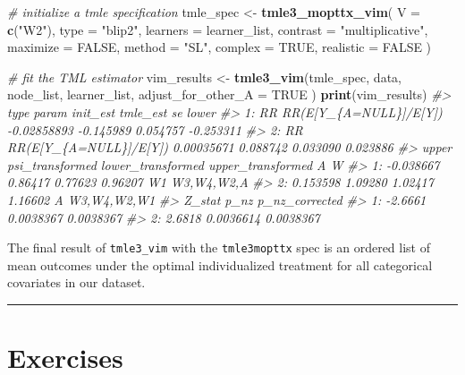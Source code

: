 \documentclass[12pt, krantz2,]{book}
\newenvironment{Shaded}{\begin{snugshade}}{\end{snugshade}}
\newcommand{\CommentTok}[1]{\textcolor[rgb]{0.56,0.35,0.01}{\textit{#1}}}
\newcommand{\DataTypeTok}[1]{\textcolor[rgb]{0.13,0.29,0.53}{#1}}
\newcommand{\KeywordTok}[1]{\textcolor[rgb]{0.13,0.29,0.53}{\textbf{#1}}}
\newcommand{\NormalTok}[1]{#1}
\newcommand{\OtherTok}[1]{\textcolor[rgb]{0.56,0.35,0.01}{#1}}
\newcommand{\StringTok}[1]{\textcolor[rgb]{0.31,0.60,0.02}{#1}}
\theoremstyle{definition}
\theoremstyle{definition}
\theoremstyle{definition}
\newcommand{\1}{\mathbbm{1}}
\begin{document}
\begin{Shaded}
\begin{Highlighting}[]
\CommentTok{# initialize a tmle specification}
\NormalTok{tmle_spec <-}\StringTok{ }\KeywordTok{tmle3_mopttx_vim}\NormalTok{(}
  \DataTypeTok{V =} \KeywordTok{c}\NormalTok{(}\StringTok{"W2"}\NormalTok{),}
  \DataTypeTok{type =} \StringTok{"blip2"}\NormalTok{,}
  \DataTypeTok{learners =}\NormalTok{ learner_list,}
  \DataTypeTok{contrast =} \StringTok{"multiplicative"}\NormalTok{,}
  \DataTypeTok{maximize =} \OtherTok{FALSE}\NormalTok{,}
  \DataTypeTok{method =} \StringTok{"SL"}\NormalTok{,}
  \DataTypeTok{complex =} \OtherTok{TRUE}\NormalTok{,}
  \DataTypeTok{realistic =} \OtherTok{FALSE}
\NormalTok{)}
\end{Highlighting}
\end{Shaded}

\begin{Shaded}
\begin{Highlighting}[]
\CommentTok{# fit the TML estimator}
\NormalTok{vim_results <-}\StringTok{ }\KeywordTok{tmle3_vim}\NormalTok{(tmle_spec, data, node_list, learner_list,}
  \DataTypeTok{adjust_for_other_A =} \OtherTok{TRUE}
\NormalTok{)}
\KeywordTok{print}\NormalTok{(vim_results)}
\CommentTok{#>    type                  param    init_est  tmle_est       se     lower}
\CommentTok{#> 1:   RR RR(E[Y_\{A=NULL\}]/E[Y]) -0.02858893 -0.145989 0.054757 -0.253311}
\CommentTok{#> 2:   RR RR(E[Y_\{A=NULL\}]/E[Y])  0.00035671  0.088742 0.033090  0.023886}
\CommentTok{#>        upper psi_transformed lower_transformed upper_transformed  A           W}
\CommentTok{#> 1: -0.038667         0.86417           0.77623           0.96207 W1  W3,W4,W2,A}
\CommentTok{#> 2:  0.153598         1.09280           1.02417           1.16602  A W3,W4,W2,W1}
\CommentTok{#>     Z_stat      p_nz p_nz_corrected}
\CommentTok{#> 1: -2.6661 0.0038367      0.0038367}
\CommentTok{#> 2:  2.6818 0.0036614      0.0038367}
\end{Highlighting}
\end{Shaded}

The final result of \texttt{tmle3\_vim} with the \texttt{tmle3mopttx} spec is an ordered list
of mean outcomes under the optimal individualized treatment for all categorical
covariates in our dataset.

\begin{center}\rule{0.5\linewidth}{0.5pt}\end{center}

\hypertarget{exercises-2}{%
\section{Exercises}\label{exercises-2}}
\end{document}
